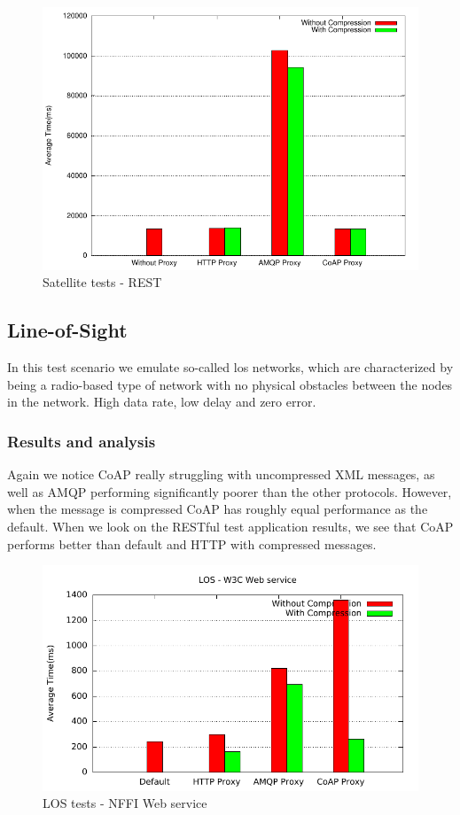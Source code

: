 \begin{figure}[H]
\center
\includegraphics[scale=0.75]{../results/satellite/rest/result.pdf}
\caption{Satellite tests - REST}
\end{figure}

\subsection{Line-of-Sight}

In this test scenario we emulate so-called \gls{los} networks, which are
characterized by being a radio-based type of network with no physical obstacles
between the nodes in the network. High data rate, low delay and zero error.

\subsubsection{Results and analysis}

Again we notice CoAP really struggling with uncompressed XML messages, as well
as AMQP performing significantly poorer than the other protocols. However,
when the message is compressed CoAP has roughly equal performance as the
default. When we look on the RESTful test application results, we see that
CoAP performs better than default and HTTP with compressed messages.

\begin{figure}[H]
\center
\includegraphics[scale=0.75]{../results/los/nffi/out.pdf}
\caption{LOS tests - NFFI Web service}
\end{figure}

